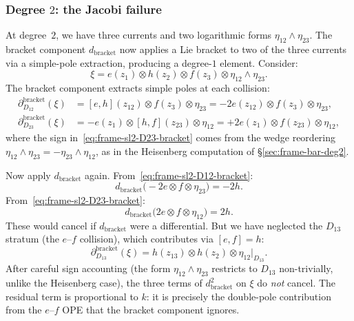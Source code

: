 \subsubsection*{Degree $2$: the Jacobi failure}

At degree~$2$, we have three currents and two logarithmic forms
$\eta_{12} \wedge \eta_{23}$.  The bracket component
$d_{\mathrm{bracket}}$ now applies a Lie bracket to two of the
three currents via a simple-pole extraction, producing a degree-$1$
element.  Consider:
\begin{equation}\label{eq:frame-sl2-deg2-element}
\xi = e(z_1) \otimes h(z_2) \otimes f(z_3)
  \otimes \eta_{12} \wedge \eta_{23}.
\end{equation}
The bracket component extracts simple poles at each collision:
\begin{align}
\partial_{D_{12}}^{\mathrm{bracket}}(\xi)
  &= [e, h](z_{12}) \otimes f(z_3) \otimes \eta_{23}
  = -2e(z_{12}) \otimes f(z_3) \otimes \eta_{23},
\label{eq:frame-sl2-D12-bracket} \\
\partial_{D_{23}}^{\mathrm{bracket}}(\xi)
  &= -e(z_1) \otimes [h, f](z_{23}) \otimes \eta_{12}
  = +2e(z_1) \otimes f(z_{23}) \otimes \eta_{12},
\label{eq:frame-sl2-D23-bracket}
\end{align}
where the sign in~\eqref{eq:frame-sl2-D23-bracket} comes from the
wedge reordering $\eta_{12} \wedge \eta_{23}
= -\eta_{23} \wedge \eta_{12}$, as in the Heisenberg computation
of \S\ref{sec:frame-bar-deg2}.

Now apply $d_{\mathrm{bracket}}$ again.  From~\eqref{eq:frame-sl2-D12-bracket}:
\[
d_{\mathrm{bracket}}\bigl(-2e \otimes f \otimes \eta_{23}\bigr)
= -2h.
\]
From~\eqref{eq:frame-sl2-D23-bracket}:
\[
d_{\mathrm{bracket}}\bigl(2e \otimes f \otimes \eta_{12}\bigr)
= 2h.
\]
These would cancel if $d_{\mathrm{bracket}}$ were a differential.
But we have neglected the $D_{13}$ stratum (the $e$--$f$ collision),
which contributes via $[e, f] = h$:
\begin{equation}\label{eq:frame-sl2-D13-bracket}
\partial_{D_{13}}^{\mathrm{bracket}}(\xi)
= h(z_{13}) \otimes h(z_2) \otimes \eta_{12}|_{D_{13}}.
\end{equation}
After careful sign accounting (the form $\eta_{12}\wedge\eta_{23}$
restricts to $D_{13}$ non-trivially, unlike the Heisenberg case),
the three terms of $d_{\mathrm{bracket}}^2$ on $\xi$ do \emph{not}
cancel.  The residual term is proportional to $k$: it is precisely
the double-pole contribution from the $e$--$f$ OPE that the
bracket component ignores.

